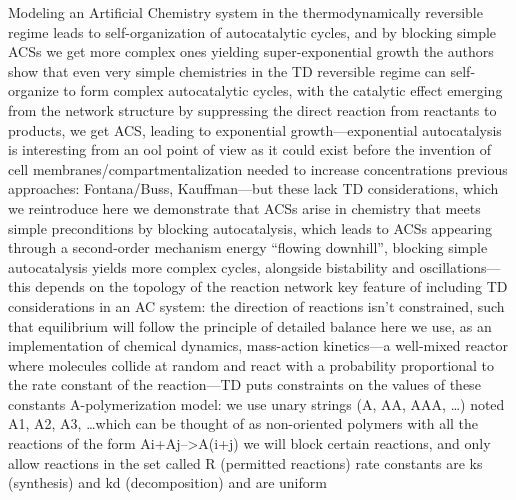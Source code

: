 \markdownRendererDocumentBegin
{} Modeling an Artificial Chemistry system in the thermodynamically reversible regime leads to self-organization of autocatalytic cycles, and by blocking simple ACSs we get more complex ones yielding super-exponential growth\markdownRendererInterblockSeparator
{}\markdownRendererUlBegin
\markdownRendererUlItem the authors show that even very simple chemistries in the TD reversible regime can self-organize to form complex autocatalytic cycles, with the catalytic effect emerging from the network structure\markdownRendererUlItemEnd 
\markdownRendererUlItem by suppressing the direct reaction from reactants to products, we get ACS, leading to exponential growth—exponential autocatalysis is interesting from an ool point of view as it could exist before the invention of cell membranes/compartmentalization needed to increase concentrations\markdownRendererUlItemEnd 
\markdownRendererUlItem previous approaches: Fontana/Buss, Kauffman—but these lack TD considerations, which we reintroduce here\markdownRendererUlItemEnd 
\markdownRendererUlItem we demonstrate that ACSs  arise in chemistry that meets simple preconditions by blocking autocatalysis, which leads to ACSs appearing through a second-order mechanism\markdownRendererUlItemEnd 
\markdownRendererUlItem energy “flowing downhill”, blocking simple autocatalysis yields more complex cycles, alongside bistability and oscillations—this depends on the topology of the reaction network\markdownRendererUlItemEnd 
\markdownRendererUlItem key feature of including TD considerations in an AC system: the direction of reactions isn’t constrained, such that equilibrium will follow the principle of detailed balance\markdownRendererUlItemEnd 
\markdownRendererUlItem here we use, as an implementation of chemical dynamics, mass-action kinetics—a well-mixed reactor where molecules collide at random and react with a probability proportional to the rate constant of the reaction—TD puts constraints on the values of these constants\markdownRendererUlItemEnd 
\markdownRendererUlItem A-polymerization model: we use unary strings (A, AA, AAA, …) noted A1, A2, A3, …which can be thought of as non-oriented polymers with all the reactions of the form Ai+Aj-->A(i+j)\markdownRendererUlItemEnd 
\markdownRendererUlItem we will block certain reactions, and only allow reactions in the set called R (permitted reactions)\markdownRendererUlItemEnd 
\markdownRendererUlItem rate constants are ks (synthesis) and kd (decomposition) and are uniform\markdownRendererUlItemEnd 
